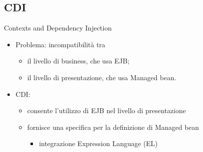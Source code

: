 \subsection{CDI}

\begin{frame}{Contexts and Dependency Injection}

\begin{itemize}
\item Problema: incompatibilità tra
	\begin{itemize}
	
	\vspace{0.5em}
	
	\item il livello di business, che usa EJB;
	
	\vspace{0.8em}
	
	\item il livello di presentazione, che usa Managed bean.
	\end{itemize}
	
\vspace{1em}	

\item CDI:
	\begin{itemize}
	
	\vspace{0.5em}
	
	\item consente l'utilizzo di EJB nel livello di presentazione
	
	\vspace{0.8em}
	
	\item fornisce una specifica per la definizione di Managed bean
		\begin{itemize}
		
		\vspace{0.5em}
		
		\item integrazione Expression Language (EL)
		\end{itemize}
	\end{itemize}
\end{itemize}

\end{frame}



